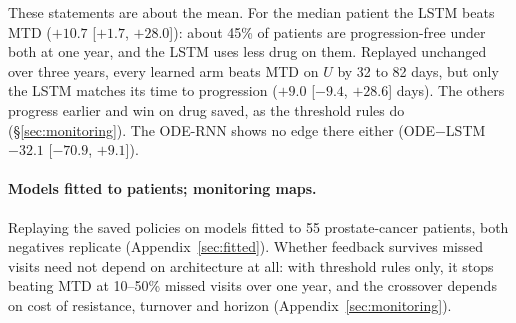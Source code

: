 \documentclass[10pt]{article}
\begin{document}
These statements are about the mean. For the median patient the LSTM beats MTD
($+10.7$ [$+1.7$, $+28.0$]): about 45\% of patients are progression-free under
both at one year, and the LSTM uses less drug on them. Replayed unchanged over
three years, every learned arm beats MTD on $U$ by 32 to 82 days, but only the
LSTM matches its time to progression ($+9.0$ [$-9.4$, $+28.6$] days). The others
progress earlier and win on drug saved, as the threshold rules do
(\S\ref{sec:monitoring}). The ODE-RNN shows no edge there either (ODE$-$LSTM
$-32.1$ [$-70.9$, $+9.1$]). %

\paragraph{Models fitted to patients; monitoring maps.} Replaying the saved
policies on models fitted to 55 prostate-cancer patients, both negatives
replicate (Appendix~\ref{sec:fitted}). Whether feedback survives missed visits
need not depend on architecture at all: with threshold rules only, it stops
beating MTD at 10--50\% missed visits over one year, and the crossover depends
on cost of resistance, turnover and horizon (Appendix~\ref{sec:monitoring}).
\end{document}
